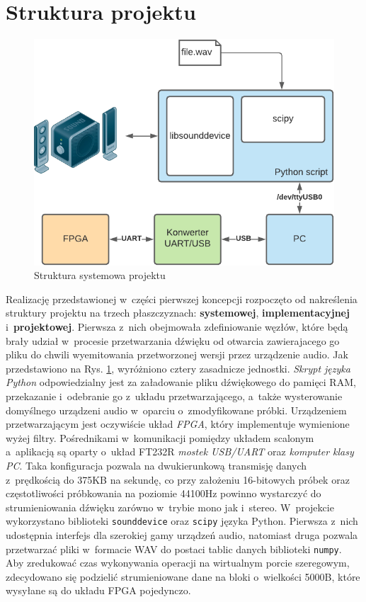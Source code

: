 \section{Struktura projektu}

\vspace{0.5cm}
\begin{figure}[ht]
    \centering
    \includegraphics[scale=0.75]{img/diagrams/system.pdf}
    \captionsetup{format=plain,justification=centering}
    \caption{Struktura systemowa projektu}
    \label{system-structure}
\end{figure}
\vspace{0.5cm}

Realizację przedstawionej w~części pierwszej koncepcji rozpoczęto od nakreślenia struktury projektu na trzech płaszczyznach: \textbf{systemowej}, \textbf{implementacyjnej} i~\textbf{projektowej}. Pierwsza z~nich obejmowała zdefiniowanie węzłów, które będą brały udział w~procesie przetwarzania dźwięku od otwarcia zawierajacego go pliku do chwili wyemitowania przetworzonej wersji przez urządzenie audio. Jak przedstawiono na Rys. \ref{system-structure}, wyróżniono cztery zasadnicze jednostki. \textit{Skrypt języka Python} odpowiedzialny jest za załadowanie pliku dźwiękowego do pamięci RAM, przekazanie i~odebranie go z~układu przetwarzającego, a~także wysterowanie domyślnego urządzeni audio w~oparciu o~zmodyfikowane próbki. Urządzeniem przetwarzającym jest oczywiście układ \textit{FPGA}, który implementuje wymienione wyżej filtry. Pośrednikami w~komunikacji pomiędzy układem scalonym a~aplikacją są oparty o~układ FT232R \textit{mostek USB/UART} oraz \textit{komputer klasy PC}. Taka konfiguracja pozwala na dwukierunkową transmisję danych z~prędkością do 375KB na sekundę, co przy założeniu 16-bitowych próbek oraz częstotliwości próbkowania na poziomie 44100Hz powinno wystarczyć do strumieniowania dźwięku zarówno w~trybie mono jak i~stereo. W~projekcie wykorzystano biblioteki \verb|sounddevice| oraz \verb|scipy| języka Python. Pierwsza z~nich udostępnia interfejs dla szerokiej gamy urządzeń audio, natomiast druga pozwala przetwarzać pliki w~formacie WAV do postaci tablic danych biblioteki \verb|numpy|. Aby zredukować czas wykonywania operacji na wirtualnym porcie szeregowym, zdecydowano się podzielić strumieniowane dane na bloki o~wielkości 5000B, które wysyłane są do układu FPGA pojedynczo.

